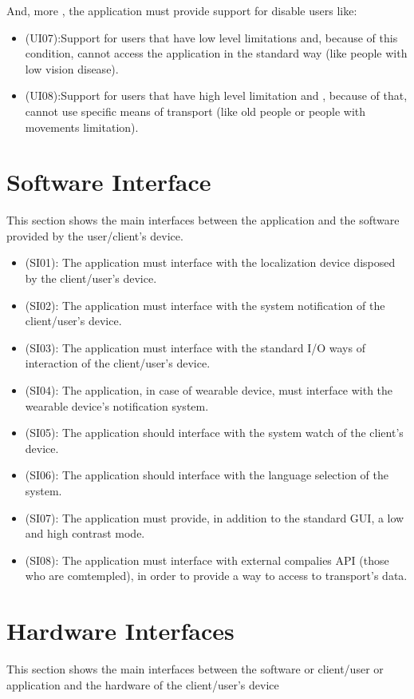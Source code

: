 \documentclass[a4paper]{book}
\begin{document}
And, more , the application must provide support for disable users like:
\begin{itemize}

\item (UI07):Support for users that have low level limitations and, because of this condition, cannot access the application in the standard way (like people with low vision disease). 
\item (UI08):Support for users that have high level limitation and , because of that, cannot use specific means of transport (like old people or people with movements limitation).

\end{itemize}

\section{Software Interface}
This section shows the main interfaces between the application and the software provided by the user/client's device.

\begin{itemize}
\item (SI01): The application must interface with the localization device disposed by the client/user's device.
\item (SI02): The application must interface with the system notification of the client/user's device.
\item (SI03): The application must interface with the standard I/O ways of interaction of the client/user's device.
\item (SI04): The application, in case of wearable device, must interface with the wearable device's notification system.
\item (SI05): The application should interface with the system watch of the client's device.
\item (SI06): The application should interface with the language selection of the system.
\item (SI07): The application must provide, in addition to the standard GUI, a low and high contrast mode. 
\item (SI08): The application must interface with external compalies API (those who are comtempled), in order to provide a way to access to transport's data.
\end{itemize}

\section{Hardware Interfaces}
This section shows the main interfaces between the software or client/user or application and the hardware of the client/user's device
\end{document}

